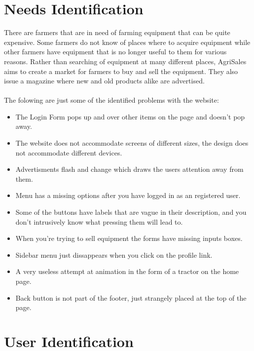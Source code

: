 \documentclass[12pt]{article}
\begin{document}


\tableofcontents

\newpage

\section{Needs Identification}

There are farmers that are in need of farming equipment that can be quite expensive. Some farmers do not know of places where to acquire equipment while other farmers have equipment that is no longer useful to them for various reasons. Rather than searching of equipment at many different places, AgriSales aims to create a market for farmers to buy and sell the equipment. They also issue a magazine where new and old products alike are advertised.
\\ \\
The folowing are just some of the identified problems with the website:

\begin{itemize}
	\item The Login Form pops up and over other items on the page and doesn’t pop away.
	\item The website does not accommodate screens of different sizes, the design does not accommodate different devices.
	\item Advertisments flash and change which draws the users attention away from them.
	\item Menu has a missing options after you have logged in as an registered user.
	\item Some of the buttons have labels that are vague in their description, and you don’t intrusively know what pressing them will lead to.
	\item When you're trying to sell equipment the forms have missing inputs boxes.
	\item Sidebar menu just dissappears when you click on the profile link.
	\item A very useless attempt at animation in the form of a tractor on the home page.
	\item Back button is not part of the footer, just strangely placed at the top of the page.
\end{itemize}

\section{User Identification}
\end{document}
